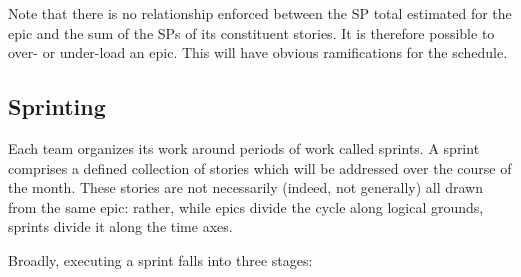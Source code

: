Note that there is no relationship enforced between the \gls{SP} total estimated for the \gls{epic} and the sum of the \glspl{SP} of its constituent stories.
It is therefore possible to over- or under-load an \gls{epic}.
This will have obvious ramifications for the schedule.

\subsection{Sprinting}
\label{sec:sprinting}

Each team organizes its work around periods of work called sprints.
A sprint comprises a defined collection of stories which will be addressed over the course of the month.
These stories are not necessarily (indeed, not generally) all drawn from the same \gls{epic}: rather, while \glspl{epic} divide the \gls{cycle} along logical grounds, sprints divide it along the time axes.

Broadly, executing a sprint falls into three stages:

